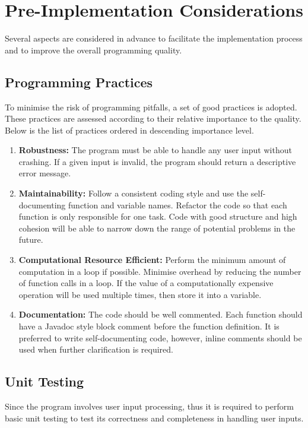 \documentclass[12pt, a4paper]{article}
\begin{document}
\renewcommand{\baselinestretch}{1.3}\normalsize
\tableofcontents
\renewcommand{\baselinestretch}{1.0}\normalsize
\newpage

\section{Pre-Implementation Considerations}
Several aspects are considered in advance to facilitate the implementation process and to improve
the overall programming quality.

\subsection{Programming Practices} \label{sec:practices}
To minimise the risk of programming pitfalls, a set of good practices is adopted. These practices
are assessed according to their relative importance to the quality. Below is the list of practices
ordered in descending importance level.

\begin{enumerate}
  \item \textbf{Robustness:} The program must be able to handle any user input without crashing. If
  a given input is invalid, the program should return a descriptive error message.
  \item \textbf{Maintainability:} Follow a consistent coding style and use the self-documenting
  function and variable names. Refactor the code so that each function is only responsible for one
  task. Code with good structure and high cohesion will be able to narrow down the range of
  potential problems in the future.
  \item \textbf{Computational Resource Efficient:} Perform the minimum amount of computation in a
  loop if possible. Minimise overhead by reducing the number of function calls in a loop. If the
  value of a computationally expensive operation will be used multiple times, then store it into a
  variable.
  \item \textbf{Documentation:} The code should be well commented. Each function should have a
  Javadoc style block comment before the function definition. It is preferred to write
  self-documenting code, however, inline comments should be used when further clarification is
  required.
\end{enumerate}

\subsection{Unit Testing}
Since the program involves user input processing, thus it is required to perform basic unit testing
to test its correctness and completeness in handling user inputs.
\end{document}
